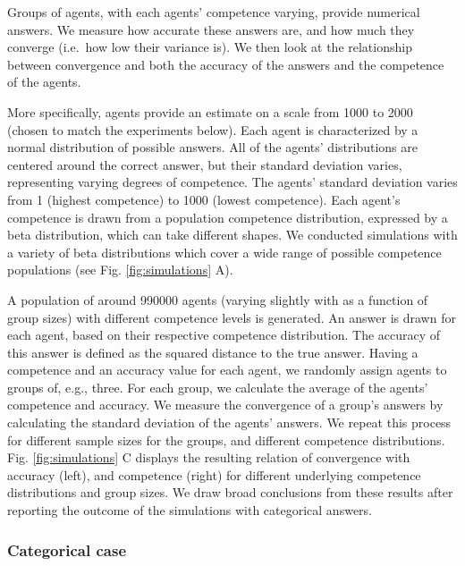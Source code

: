 \documentclass[
  doc,floatsintext]{apa6}
\begin{document}
Groups of agents, with each agents' competence varying, provide numerical answers. We measure how accurate these answers are, and how much they converge (i.e.~how low their variance is). We then look at the relationship between convergence and both the accuracy of the answers and the competence of the agents.

More specifically, agents provide an estimate on a scale from 1000 to 2000 (chosen to match the experiments below). Each agent is characterized by a normal distribution of possible answers. All of the agents' distributions are centered around the correct answer, but their standard deviation varies, representing varying degrees of competence. The agents' standard deviation varies from 1 (highest competence) to 1000 (lowest competence). Each agent's competence is drawn from a population competence distribution, expressed by a beta distribution, which can take different shapes. We conducted simulations with a variety of beta distributions which cover a wide range of possible competence populations (see Fig. \ref{fig:simulations} A).

A population of around 990000 agents (varying slightly with as a function of group sizes) with different competence levels is generated. An answer is drawn for each agent, based on their respective competence distribution. The accuracy of this answer is defined as the squared distance to the true answer. Having a competence and an accuracy value for each agent, we randomly assign agents to groups of, e.g., three. For each group, we calculate the average of the agents' competence and accuracy. We measure the convergence of a group's answers by calculating the standard deviation of the agents' answers. We repeat this process for different sample sizes for the groups, and different competence distributions. Fig. \ref{fig:simulations} C displays the resulting relation of convergence with accuracy (left), and competence (right) for different underlying competence distributions and group sizes. We draw broad conclusions from these results after reporting the outcome of the simulations with categorical answers.

\subsubsection{Categorical case}\label{categorical-case}
\end{document}
